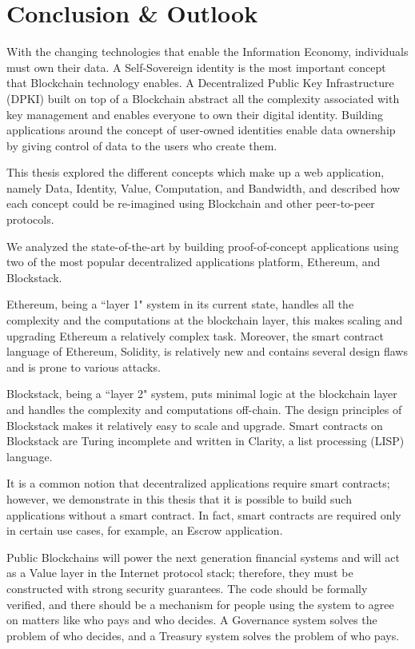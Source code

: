\chapter{Conclusion \& Outlook}\label{chapter::conclusion}
With the changing technologies that enable the Information Economy, individuals must own their data. A Self-Sovereign identity is the most important concept that Blockchain technology enables. A Decentralized Public Key Infrastructure (DPKI) built on top of a Blockchain abstract all the complexity associated with key management and enables everyone to own their digital identity. Building applications around the concept of user-owned identities enable data ownership by giving control of data to the users who create them.

This thesis explored the different concepts which make up a web application, namely Data, Identity, Value, Computation, and Bandwidth, and described how each concept could be re-imagined using Blockchain and other peer-to-peer protocols.

We analyzed the state-of-the-art by building proof-of-concept applications using two of the most popular decentralized applications platform, Ethereum, and Blockstack. 

Ethereum, being a ``layer 1" system in its current state, handles all the complexity and the computations at the blockchain layer, this makes scaling and upgrading Ethereum a relatively complex task. Moreover, the smart contract language of Ethereum, Solidity, is relatively new and contains several design flaws and is prone to various attacks.

Blockstack, being a ``layer 2" system, puts minimal logic at the blockchain layer and handles the complexity and computations off-chain. The design principles of Blockstack makes it relatively easy to scale and upgrade. Smart contracts on Blockstack are Turing incomplete and written in Clarity, a list processing (LISP) language.

It is a common notion that decentralized applications require smart contracts; however, we demonstrate in this thesis that it is possible to build such applications without a smart contract. In fact, smart contracts are required only in certain use cases, for example, an Escrow application.

Public Blockchains will power the next generation financial systems and will act as a Value layer in the Internet protocol stack; therefore, they must be constructed with strong security guarantees. The code should be formally verified, and there should be a mechanism for people using the system to agree on matters like who pays and who decides. A Governance system solves the problem of who decides, and a Treasury system solves the problem of who pays.

